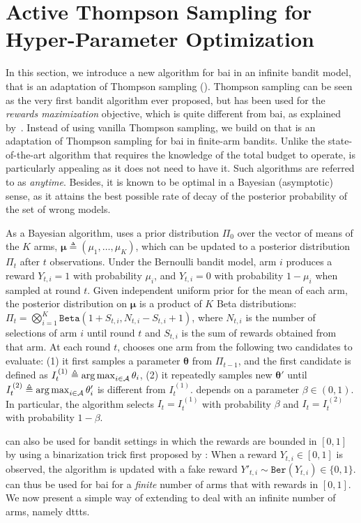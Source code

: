 \section{Active Thompson Sampling for Hyper-Parameter Optimization}\label{sec:dttts.algorithm}

In this section, we introduce a new algorithm for \gls{bai} in an infinite bandit model, that is an adaptation of Thompson sampling (\citealp{thompson1933}). Thompson sampling can be seen as the very first bandit algorithm ever proposed, but has been used for the \emph{rewards maximization} objective, which is quite different from \gls{bai}, as explained by~\cite{bubeck2009pure}. Instead of using vanilla Thompson sampling, we build on \TTTS that is an adaptation of Thompson sampling for \gls{bai} in finite-arm bandits. Unlike the state-of-the-art algorithm \SHA that requires the knowledge of the total budget to operate, \TTTS is particularly appealing as it does not need to have it. Such algorithms are referred to as \emph{anytime}. Besides, it is known to be optimal in a Bayesian (asymptotic) sense, as it attains the best possible rate of decay of the posterior probability of the set of wrong models. 

As a Bayesian algorithm, \TTTS uses a prior distribution $\Pi_0$ over the vector of means of the $K$ arms, $\bm\mu \triangleq (\mu_1,\dots,\mu_K)$, which can be updated to a posterior distribution $\Pi_t$ after $t$ observations. Under the Bernoulli bandit model, arm $i$ produces a reward $Y_{t,i}=1$ with probability $\mu_i$, and $Y_{t,i}=0$ with probability $1-\mu_i$ when sampled at round $t$. Given independent uniform prior for the mean of each arm, the posterior distribution on $\bm\mu$ is a product of $K$ Beta distributions: $\Pi_t = \bigotimes_{i=1}^{K} \texttt{Beta}(1+S_{t,i},N_{t,i}-S_{t,i}+1)$, where $N_{t,i}$ is the number of selections of arm $i$ until round $t$ and $S_{t,i}$ is the sum of rewards obtained from that arm. At each round $t$, \TTTS chooses one arm from the following two candidates to evaluate: (1) it first samples a parameter ${\bm\theta}$ from $\Pi_{t-1}$, and the first candidate is defined as $I_t^{\,(1)} \triangleq \operatorname*{arg\,max}_{i\in\mathcal{A}} {\theta}_i$, (2) it repeatedly samples new ${\bm\theta}'$ until $I_t^{\,(2)} \triangleq \operatorname*{arg\,max}_{i\in\mathcal{A}} \theta_i'$ is different from $I_t^{\,(1)}$. \TTTS depends on a parameter $\beta \in (0,1)$. In particular, the algorithm selects $I_t = I_t^{\,(1)}$ with probability $\beta$ and $I_t = I_t^{\,(2)}$ with probability $1-\beta$.

\TTTS can also be used for bandit settings in which the rewards are bounded in $[0,1]$ by using a binarization trick first proposed by \cite{agrawal2012analysis}: When a reward $Y_{t,i} \in [0,1]$ is observed, the algorithm is updated with a fake reward  $Y'_{t,i} \sim \texttt{Ber}(Y_{t,i}) \in \{0,1\}$. \TTTS can thus be used for \gls{bai} for a \emph{finite} number of arms that with rewards in $[0,1]$. We now present a simple way of extending \TTTS{} to deal with an infinite number of arms, namely \gls{dttts}.

